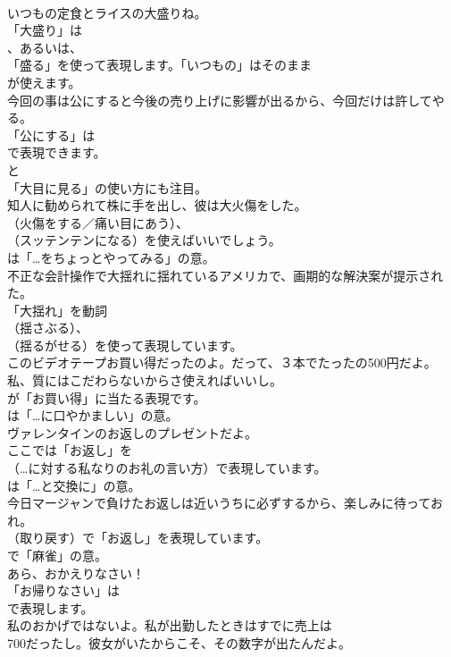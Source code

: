 \documentclass[8pt]{extreport}
\begin{document}
\begin{CJK}{UTF8}{min}
\\	いつもの定食とライスの大盛りね。 
\\	「大盛り」は
\\	、あるいは、
\\	「盛る」を使って表現します。「いつもの」はそのまま
\\	が使えます。	
\\	今回の事は公にすると今後の売り上げに影響が出るから、今回だけは許してやる。 
\\	「公にする」は
\\	で表現できます。
\\	と
\\	「大目に見る」の使い方にも注目。	
\\	知人に勧められて株に手を出し、彼は大火傷をした。 
\\	（火傷をする／痛い目にあう）、
\\	（スッテンテンになる）を使えばいいでしょう。
\\	は「…をちょっとやってみる」の意。	
\\	不正な会計操作で大揺れに揺れているアメリカで、画期的な解決案が提示された。 
\\	「大揺れ」を動詞 
\\	（揺さぶる）、
\\	（揺るがせる）を使って表現しています。	
\\	このビデオテープお買い得だったのよ。だって、３本でたったの500円だよ。私、質にはこだわらないからさ使えればいいし。 
\\	が「お買い得」に当たる表現です。
\\	は「…に口やかましい」の意。	
\\	ヴァレンタインのお返しのプレゼントだよ。 
\\	ここでは「お返し」を 
\\	（…に対する私なりのお礼の言い方）で表現しています。
\\	は「…と交換に」の意。	
\\	今日マージャンで負けたお返しは近いうちに必ずするから、楽しみに待っておれ。 
\\	（取り戻す）で「お返し」を表現しています。
\\	で「麻雀」の意。	
\\	あら、おかえりなさい！ 
\\	「お帰りなさい」は
\\	で表現します。	
\\	私のおかげではないよ。私が出勤したときはすでに売上は
\\	700だったし。彼女がいたからこそ、その数字が出たんだよ。 

\end{CJK}
\end{document}
